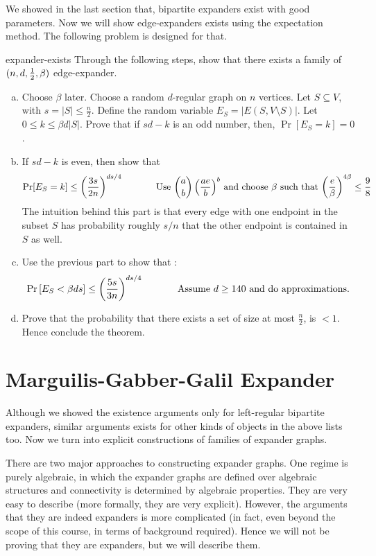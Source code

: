 We showed in the last section that, bipartite expanders exist with good parameters. Now we will show edge-expanders exists using the expectation method. The following problem is designed for that.

\begin{exercise-prob}
\begin{show-ps3}{expander-exists}
Through the following steps, show that there exists a family of $(n,d,\frac{1}{2},\beta)$ edge-expander.
\begin{enumerate}[(a)]
\item Choose $\beta$ later. Choose a random $d$-regular graph on $n$ vertices. Let $S \subseteq V$, with $s=|S| \le \frac{n}{2}$. Define the random variable $E_S = |E(S,V\setminus S)|$. Let $0 \le k \le \beta d |S|$. Prove that if $sd-k$ is an odd number, then, $\Pr[E_S = k] = 0$.
\item If $sd-k$ is even, then show that 
$$\Pr[E_S=k] \le \left(\frac{3s}{2n}\right)^{ds/4}
\textrm{ \hspace{1cm} Use ${a \choose b} \left( \frac{ae}{b}\right)^b$ and choose $\beta$ such that $\left(\frac{e}{\beta}\right)^{4\beta} \le \frac{9}{8}$} 
$$
The intuition behind this part is that every edge with one endpoint in the subset $S$ has probability roughly $s/n$ that the other endpoint is contained in $S$
as well.
\item Use the previous part to show that :
$$ \Pr\left[E_S < \beta ds\right] \le \left(\frac{5s}{3n}\right)^{ds/4} \textrm{ \hspace{1cm} Assume $d \ge 140$ and do approximations.}$$
\item Prove that the probability that there exists a set of size at most $\frac{n}{2}$, is $<1$. Hence conclude the theorem.
\end{enumerate}
\end{show-ps3}
\end{exercise-prob}

\section{Marguilis-Gabber-Galil Expander}

Although we showed the existence arguments only for left-regular bipartite expanders, similar arguments exists for other kinds of objects in the above lists too. Now we turn into explicit constructions of families of expander graphs.

There are two major approaches to constructing expander graphs. One regime is purely algebraic, in which the expander graphs are defined over algebraic structures and connectivity is determined by algebraic properties. They are very easy to describe (more formally, they are very explicit). However, the arguments that they are indeed expanders is more complicated (in fact, even beyond the scope of this course, in terms of background required). Hence we will not be proving that they are expanders, but we will describe them. 

